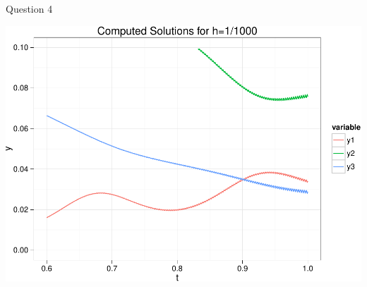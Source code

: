\documentclass{beamer}
\begin{document}
\begin{frame}{Question 4}
	\begin{center}
		\includegraphics[width=\textwidth]{plot-small-crop.pdf}
	\end{center}
\end{frame}
\end{document}
